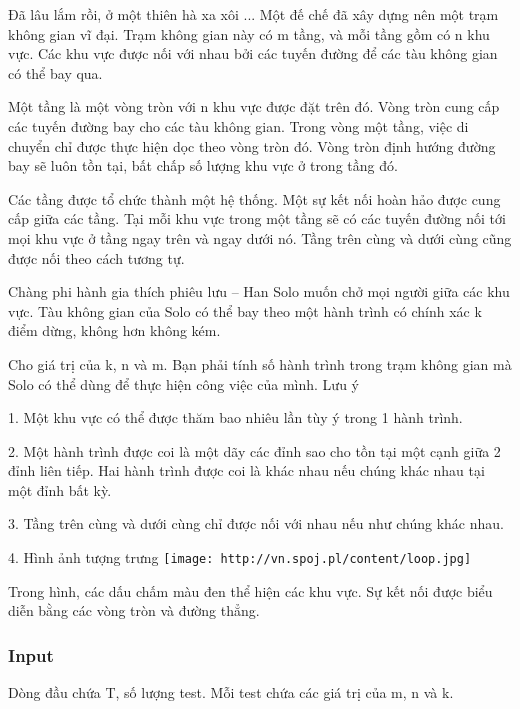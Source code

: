 



   Đã lâu lắm rồi, ở một thiên hà xa xôi ... Một đế chế đã xây dựng nên một trạm không gian vĩ đại. Trạm không gian này có m tầng, và mỗi tầng gồm có n khu vực. Các khu vực được nối với nhau bởi các tuyến đường để các tàu không gian có thể bay qua.  

   Một tầng là một vòng tròn với n khu vực được đặt trên đó. Vòng tròn cung cấp các tuyến đường bay cho các tàu không gian. Trong vòng một tầng, việc di chuyển chỉ được thực hiện dọc theo vòng tròn đó. Vòng tròn định hướng đường bay sẽ luôn tồn tại, bất chấp số lượng khu vực ở trong tầng đó.  

   Các tầng được tổ chức thành một hệ thống. Một sự kết nối hoàn hảo được cung cấp giữa các tầng. Tại mỗi khu vực trong một tầng sẽ có các tuyến đường nối tới mọi khu vực ở tầng ngay trên và ngay dưới nó. Tầng trên cùng và dưới cùng cũng được nối theo cách tương tự.  

   Chàng phi hành gia thích phiêu lưu -- Han Solo muốn chở mọi người giữa các khu vực. Tàu không gian của Solo có thể bay theo một hành trình có chính xác k điểm dừng, không hơn không kém.  

   Cho giá trị của k, n và m. Bạn phải tính số hành trình trong trạm không gian mà Solo có thể dùng để thực hiện công việc của mình.       Lưu ý    
\begin{itemize}

    1. Một khu vực có thể được thăm bao nhiêu lần tùy ý trong 1 hành trình.   

    2. Một hành trình được coi là một dãy các đỉnh sao cho tồn tại một cạnh giữa 2 đỉnh liên tiếp. Hai hành trình được coi là khác nhau nếu chúng khác nhau tại một đỉnh bất kỳ.   

    3. Tầng trên cùng và dưới cùng chỉ được nối với nhau nếu như chúng khác nhau.   

    4. Hình ảnh tượng trưng   
\texttt{[image: http://vn.spoj.pl/content/loop.jpg]}

    Trong hình, các dấu chấm màu đen thể hiện các khu vực. Sự kết nối được biểu diễn bằng các vòng tròn và đường thẳng.   
\end{itemize}

\subsubsection{   Input  }

   Dòng đầu chứa T, số lượng test. Mỗi test chứa các giá trị của m, n và k.  

